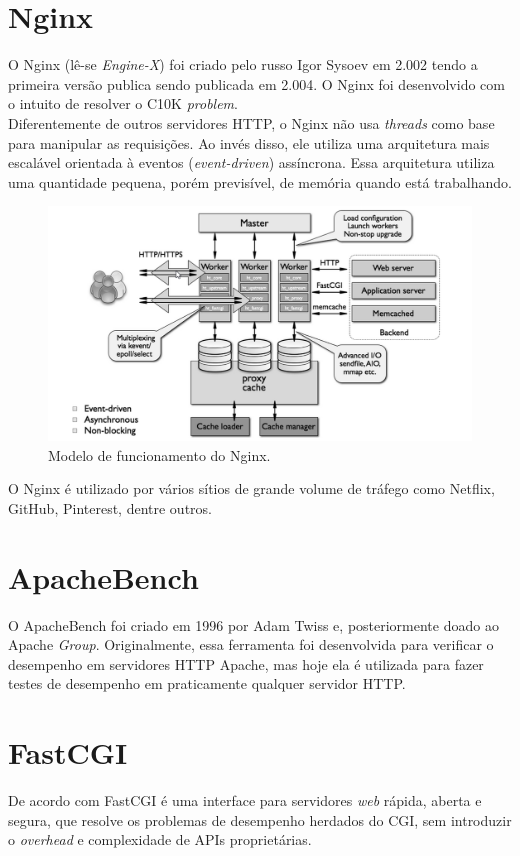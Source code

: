 \section{Nginx}
O Nginx (lê-se \textit{Engine-X}) foi criado pelo russo Igor Sysoev em 2.002 tendo a primeira versão publica sendo publicada em 2.004. O Nginx foi desenvolvido com o intuito de resolver o C10K \textit{problem}.\\
Diferentemente de outros servidores HTTP, o Nginx não usa \textit{threads} como base para manipular as requisições. Ao invés disso, ele utiliza uma arquitetura mais escalável orientada à eventos (\textit{event-driven}) assíncrona. Essa arquitetura utiliza uma quantidade pequena, porém previsível, de memória quando está trabalhando.\\
\begin{figure}[h!]
\centering
\includegraphics[scale=1]{figuras/nginx-how-it-works} 
\caption{Modelo de funcionamento do Nginx.}
\label{fig:nginx-comofunciona}
\end{figure}
O Nginx é utilizado por vários sítios de grande volume de tráfego como Netflix, GitHub, Pinterest, dentre outros.\\
\section{ApacheBench}
O ApacheBench foi criado em 1996 por Adam Twiss e, posteriormente doado ao Apache \textit{Group}. Originalmente, essa ferramenta foi desenvolvida para verificar o desempenho em servidores HTTP Apache, mas hoje ela é utilizada para fazer testes de desempenho em  praticamente qualquer servidor HTTP.
\section{FastCGI}
De acordo com  FastCGI é uma interface para servidores \textit{web} rápida, aberta e segura, que resolve os problemas de desempenho herdados do CGI, sem introduzir o \textit{overhead} e complexidade de APIs proprietárias.
